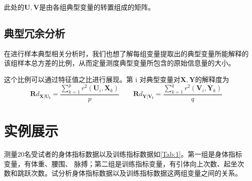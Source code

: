 \documentclass[withoutpreface]{cumcmthesis}
\begin{document}
此处的$\mathbf{U},\mathbf{V}$是由各组典型变量的转置组成的矩阵。

\subsection{典型冗余分析}
在进行样本典型相关分析时，我们也想了解每组变量提取出的典型变量所能解释的该组样本总方差的比例，从而定量测度典型变量所包含的原始信息量的大小。

这个比例可以通过特征值之比进行展现。第 i 对典型变量对$\mathbf{X},\mathbf{Y}$的解释度为
$$\mathbf{R}d_{\mathbf{X|U_i}}=\frac{\sum\limits_{k=1}^{p}r^2(\mathbf{U}_i,\mathbf{X}_k)}{p}\qquad\mathbf{R}d_{\mathbf{Y|V_i}}=\frac{\sum\limits_{k=1}^{q}r^2(\mathbf{V}_i,\mathbf{Y}_k)}{q}$$

\section{实例展示}
测量20名受试者的身体指标数据以及训练指标数据如\cref{Tab:1}。第一组是身体指标变量，有体重、腰围、 脉搏；第二组是训练指标变量，有引体向上次数、起坐次数和跳跃次数。试分析身体指标数据以及训练指标数据这两组变量之间的关系。
\end{document}
